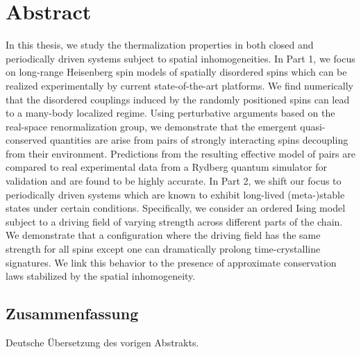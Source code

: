 \begingroup
\let\clearpage\relax
\let\cleardoublepage\relax
\let\cleardoublepage\relax

\chapter*{Abstract}

In this thesis, we study the thermalization properties in both closed and periodically driven systems subject to spatial inhomogeneities. 
In Part 1, we focus on long-range Heisenberg spin models of spatially disordered spins which can be realized experimentally by current state-of-the-art platforms.
We find numerically that the disordered couplings induced by the randomly positioned spins can lead to a many-body localized regime. Using perturbative arguments based on the real-space renormalization group, we demonstrate that the emergent quasi-conserved quantities are arise from pairs of strongly interacting spins decoupling from their environment. Predictions from the resulting effective model of pairs are compared to real experimental data from a Rydberg quantum simulator for validation and are found to be highly accurate.
In Part 2, we shift our focus to periodically driven systems which are known to exhibit long-lived (meta-)stable states under certain conditions. Specifically, we consider an ordered Ising model subject to a driving field of varying strength across different parts of the chain. We demonstrate that a configuration where the driving field has the same strength for all spins except one can dramatically prolong time-crystalline signatures. We link this behavior to the presence of approximate conservation laws stabilized by the spatial inhomogeneity.

\newpage
\begin{otherlanguage}{ngerman}
\chapter*{Zusammenfassung}
Deutsche Übersetzung des vorigen Abstrakts.
\end{otherlanguage}

\endgroup

\vfill

\color{black}